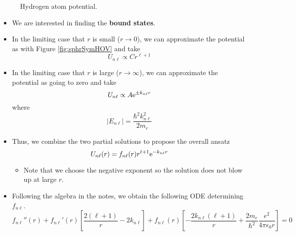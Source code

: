 \documentclass[../notes.tex]{subfiles}
\begin{document}
\begin{itemize}
\begin{figure}[h!]
        \caption{Hydrogen atom potential.}
        \label{fig:1HV}
    \end{figure}
    \begin{itemize}
        \item We are interested in finding the \textbf{bound states}.
        \item In the limiting case that $r$ is small ($r\to 0$), we can approximate the potential as with Figure \ref{fig:sphrSymHOV} and take
        \begin{equation*}
            U_{n\ell} \propto Cr^{\ell+1}
        \end{equation*}
        \item In the limiting case that $r$ is large ($r\to \infty$), we can approximate the potential as going to zero and take
        \begin{equation*}
            U_{n\ell} \propto A\e[\pm k_{n\ell}r]
        \end{equation*}
        where
        \begin{equation*}
            |E_{n\ell}| = \frac{\hbar^2k_{n\ell}^2}{2m_e}
        \end{equation*}
        \item Thus, we combine the two partial solutions to propose the overall ansatz
        \begin{equation*}
            U_{n\ell}(r) = f_{n\ell}(r)r^{\ell+1}\e[-k_{n\ell}r]
        \end{equation*}
        \begin{itemize}
            \item Note that we choose the negative exponent so the solution does not blow up at large $r$.
        \end{itemize}
        \item Following the algebra in the notes, we obtain the following ODE determining $f_{n\ell}$.
        \begin{equation*}
            f_{n\ell}''(r)+f_{n\ell}'(r)\left[ \frac{2(\ell+1)}{r}-2k_{n\ell} \right]+f_{n\ell}(r)\left[ -\frac{2k_{n\ell}(\ell+1)}{r}+\frac{2m_e}{\hbar^2}\frac{e^2}{4\pi\epsilon_0r} \right] = 0

\end{equation*}
\end{itemize}
\end{itemize}
\end{document}
